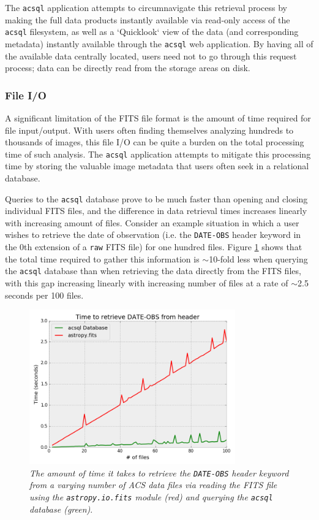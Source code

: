 \documentclass[10pt,journal,compsoc]{IEEEtran}
\begin{document}
The \texttt{acsql} application attempts to circumnavigate this retrieval process by making the full data products instantly available via read-only access of
the \texttt{acsql} filesystem, as well as a `Quicklook` view of the data (and corresponding metadata) instantly available through the \texttt{acsql} web application.
By having all of the available data centrally located, users need not to go through this request process; data can be directly read from the storage areas on disk.


\subsubsection{File I/O} \label{sec1.3.2}

A significant limitation of the FITS file format is the amount of time required for file input/output.  With users often finding themselves analyzing hundreds to
thousands of images, this file I/O can be quite a burden on the total processing time of such analysis.  The \texttt{acsql} application attempts to mitigate this
processing time by storing the valuable image metadata that users often seek in a relational database.

Queries to the \texttt{acsql} database prove to be much faster than opening and closing individual FITS files, and the difference in data retrieval times increases
linearly with increasing amount of files.  Consider an example situation in which a user wishes to retrieve the date of observation (i.e. the \texttt{DATE-OBS} header
keyword in the 0th extension of a \texttt{raw} FITS file) for one hundred files. Figure \ref{fig3} shows that the total time required to gather this information
is $\sim$10-fold less when querying the \texttt{acsql} database than when retrieving the data directly from the FITS files, with this gap increasing linearly with
increasing number of files at a rate of $\sim$2.5 seconds per 100 files.

\begin{figure}[!h]
\centering
\includegraphics[width=3.5in]{./figures/fileio_time.png}
\caption{\textit{The amount of time it takes to retrieve the \texttt{DATE-OBS} header keyword from a varying number of ACS data files via reading the FITS file using the
\texttt{astropy.io.fits} module (red) and querying the \texttt{acsql} database (green)}.}
\label{fig3}
\end{figure}
\end{document}
